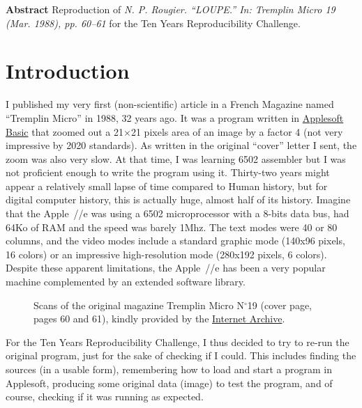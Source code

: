 \textbf{Abstract} Reproduction of {\em N. P. Rougier. “LOUPE.” In: Tremplin Micro 19 (Mar. 1988), pp. 60–61} for the Ten Years Reproducibility Challenge.

\section*{Introduction}

I published my very first (non-scientific) article\supercite{rougier:1988} in a
French Magazine named ``Tremplin Micro'' in 1988, 32 years ago. It was a
program written
in \href{https://en.wikipedia.org/wiki/Applesoft_BASIC}{Applesoft Basic} that
zoomed out a 21$\times$21 pixels area of an image by a factor 4 (not very
impressive by 2020 standards). As written in the original ``cover'' letter I
sent, the zoom was also very slow. At that time, I was learning 6502 assembler
but I was not proficient enough to write the program using it. Thirty-two years
might appear a relatively small lapse of time compared to Human history, but
for digital computer history, this is actually huge, almost half of its
history. Imagine that the Apple~//e was using a 6502 microprocessor with a
8-bits data bus, had 64Ko of RAM and the speed was barely 1Mhz. The text modes
were 40 or 80 columns, and the video modes include a standard graphic mode
(140x96 pixels, 16 colors) or an impressive high-resolution mode (280x192
pixels, 6 colors). Despite these apparent limitations, the Apple~//e has been a
very popular machine complemented by an extended software library.
\begin{figure}
{%
\fboxsep=0pt
}
\caption{Scans of the original magazine Tremplin Micro N$^\circ$19 (cover page,
pages 60 and 61), kindly provided by the
\href{https://archive.org/details/tremplin_micro_newsletter_issue_19}{Internet
Archive}.}
\label{fig:scans}
\end{figure}
For the Ten Years Reproducibility Challenge, I thus decided to try to re-run
the original program, just for the sake of checking if I could. This includes
finding the sources (in a usable form), remembering how to load and start a
program in Applesoft, producing some original data (image) to test the program,
and of course, checking if it was running as expected.

